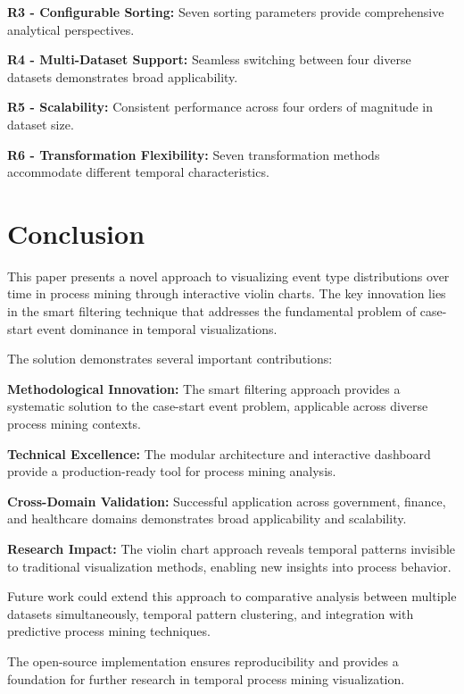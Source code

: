 \documentclass[11pt,a4paper]{article}
\begin{document}
\textbf{R3 - Configurable Sorting:} Seven sorting parameters provide comprehensive analytical perspectives.

\textbf{R4 - Multi-Dataset Support:} Seamless switching between four diverse datasets demonstrates broad applicability.

\textbf{R5 - Scalability:} Consistent performance across four orders of magnitude in dataset size.

\textbf{R6 - Transformation Flexibility:} Seven transformation methods accommodate different temporal characteristics.

\section{Conclusion}
\label{sec:conclusion}

This paper presents a novel approach to visualizing event type distributions over time in process mining through interactive violin charts. The key innovation lies in the smart filtering technique that addresses the fundamental problem of case-start event dominance in temporal visualizations.

The solution demonstrates several important contributions:

\textbf{Methodological Innovation:} The smart filtering approach provides a systematic solution to the case-start event problem, applicable across diverse process mining contexts.

\textbf{Technical Excellence:} The modular architecture and interactive dashboard provide a production-ready tool for process mining analysis.

\textbf{Cross-Domain Validation:} Successful application across government, finance, and healthcare domains demonstrates broad applicability and scalability.

\textbf{Research Impact:} The violin chart approach reveals temporal patterns invisible to traditional visualization methods, enabling new insights into process behavior.

Future work could extend this approach to comparative analysis between multiple datasets simultaneously, temporal pattern clustering, and integration with predictive process mining techniques.

The open-source implementation ensures reproducibility and provides a foundation for further research in temporal process mining visualization.



\end{document}
